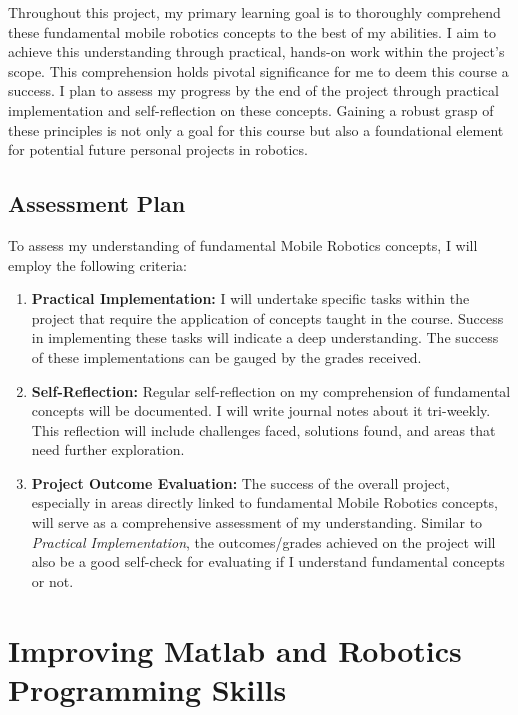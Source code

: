 \documentclass[12pt]{article}
\begin{document}
Throughout this project, my primary learning goal is to thoroughly comprehend these fundamental mobile robotics concepts to the best of my abilities. I aim to achieve this understanding through practical, hands-on work within the project's scope. This comprehension holds pivotal significance for me to deem this course a success. I plan to assess my progress by the end of the project through practical implementation and self-reflection on these concepts. Gaining a robust grasp of these principles is not only a goal for this course but also a foundational element for potential future personal projects in robotics. 

\subsection{Assessment Plan}

To assess my understanding of fundamental Mobile Robotics concepts, I will employ the following criteria:

\begin{enumerate}
    \item \textbf{Practical Implementation:} I will undertake specific tasks within the project that require the application of concepts taught in the course. Success in implementing these tasks will indicate a deep understanding. The success of these implementations can be gauged by the grades received.
    
    \item \textbf{Self-Reflection:} Regular self-reflection on my comprehension of fundamental concepts will be documented. I will write journal notes about it tri-weekly. This reflection will include challenges faced, solutions found, and areas that need further exploration.

    \item \textbf{Project Outcome Evaluation:} The success of the overall project, especially in areas directly linked to fundamental Mobile Robotics concepts, will serve as a comprehensive assessment of my understanding. Similar to \textit{Practical Implementation}, the outcomes/grades achieved on the project will also be a good self-check for evaluating if I understand fundamental concepts or not.  
\end{enumerate}

\section{Improving Matlab and Robotics Programming Skills}
\end{document}
